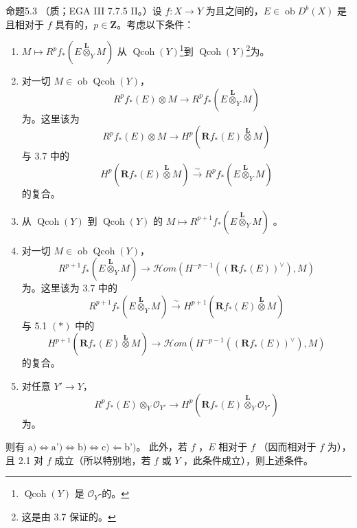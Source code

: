 \begin{SGAresult}{命题}{5.3}
（质；EGA III 7.7.5 II。）设 $f:X\to Y$ 为且之间的，$E\in\operatorname{ob}D^b(X)$ 是且相对于 $f$ 具有的，$p\in\mathbf Z$。考虑以下条件：
\begin{enumerate}
\item[a)]  $M\mapsto R^pf_*(E\mathbin{\overset{\mathbf L}{\otimes}}_YM)$ 从 $\operatorname{Qcoh}(Y)$\footnote{$\operatorname{Qcoh}(Y)$ 是 $\mathcal O_Y$-的。}到 $\operatorname{Qcoh}(Y)$\footnote{这是由 3.7 保证的。}为。
\item[a')] 对一切 $M\in\operatorname{ob}\operatorname{Qcoh}(Y)$，
\[
R^pf_*(E)\otimes M\longrightarrow R^pf_*(E\mathbin{\overset{\mathbf L}{\otimes}}_YM)
\]
为。这里该为
\[
R^pf_*(E)\otimes M\longrightarrow H^p(\mathbf Rf_*(E)\mathbin{\overset{\mathbf L}{\otimes}}M)
\]
与 3.7 中的
\[
H^p(\mathbf Rf_*(E)\mathbin{\overset{\mathbf L}{\otimes}}M)\xrightarrow{\sim}R^pf_*(E\mathbin{\overset{\mathbf L}{\otimes}}_YM)
\]
的复合。
\item[b)] 从 $\operatorname{Qcoh}(Y)$ 到 $\operatorname{Qcoh}(Y)$ 的 $M\mapsto R^{p+1}f_*(E\mathbin{\overset{\mathbf L}{\otimes}}_YM)$ 。
\item[b')] 对一切 $M\in\operatorname{ob}\operatorname{Qcoh}(Y)$，
\[
R^{p+1}f_*(E\mathbin{\overset{\mathbf L}{\otimes}}_YM)\longrightarrow
\mathcal Hom(H^{-p-1}((\mathbf Rf_*(E))^\vee),M)
\]
为。这里该为 3.7 中的
\[
R^{p+1}f_*(E\mathbin{\overset{\mathbf L}{\otimes}}_YM)\xrightarrow{\sim}
H^{p+1}(\mathbf Rf_*(E)\mathbin{\overset{\mathbf L}{\otimes}}M)
\]
与 5.1 $(*)$ 中的
\[
H^{p+1}(\mathbf Rf_*(E)\mathbin{\overset{\mathbf L}{\otimes}}M)\longrightarrow
\mathcal Hom(H^{-p-1}((\mathbf Rf_*(E))^\vee),M)
\]
的复合。
\item[c)] 对任意 $Y'\to Y$，
\[
R^pf_*(E)\otimes_Y\mathcal O_{Y'}\longrightarrow
H^p(\mathbf Rf_*(E)\mathbin{\overset{\mathbf L}{\otimes}}_Y\mathcal O_{Y'})
\]
为。
\end{enumerate}
则有 $\text{a)}\Longleftrightarrow\text{a')}\Longleftrightarrow\text{b)}\Longleftrightarrow\text{c)}\Longleftarrow\text{b')}$。
此外，若 $f$ ，$E$ 相对于 $f$ （因而相对于 $f$ 为），且 2.1 对 $f$ 成立（所以特别地，若 $f$ 或 $Y$ ，此条件成立），则上述条件。
\end{SGAresult}
